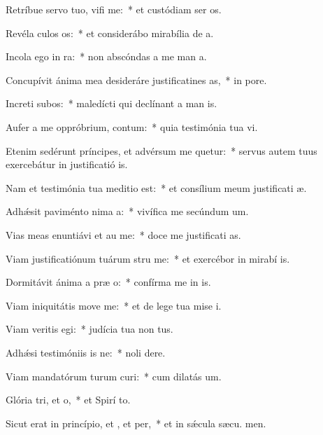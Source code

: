 \item Retríbue servo tuo, vifi me:~* et custódiam ser os.
\item Revéla culos os:~* et considerábo mirabília de  a.
\item Incola ego  in ra:~* non abscóndas a me man a.
\item Concupívit ánima mea desideráre justificatines as,~* in  pore.
\item Increti subos:~* maledícti qui declínant a man is.
\item Aufer a me oppróbrium,  contum:~* quia testimónia tua vi.
\item Etenim sedérunt príncipes, et advérsum me quetur:~* servus autem tuus exercebátur in justificatió is.
\item Nam et testimónia tua meditio  est:~* et consílium meum justificati æ.
\item Adhǽsit paviménto nima a:~* vivífica me secúndum  um.
\item Vias meas enuntiávi et au me:~* doce me justificati as.
\item Viam justificatiónum tuárum stru me:~* et exercébor in mirabí is.
\item Dormitávit ánima a præ o:~* confírma me in  is.
\item Viam iniquitátis move  me:~* et de lege tua mise i.
\item Viam veritis egi:~* judícia tua non  tus.
\item Adhǽsi testimóniis is ne:~* noli  dere.
\item Viam mandatórum turum curi:~* cum dilatás  um.
\item Glória tri, et o,~* et Spirí to.
\item Sicut erat in princípio, et , et per,~* et in sǽcula sæcu. men.
